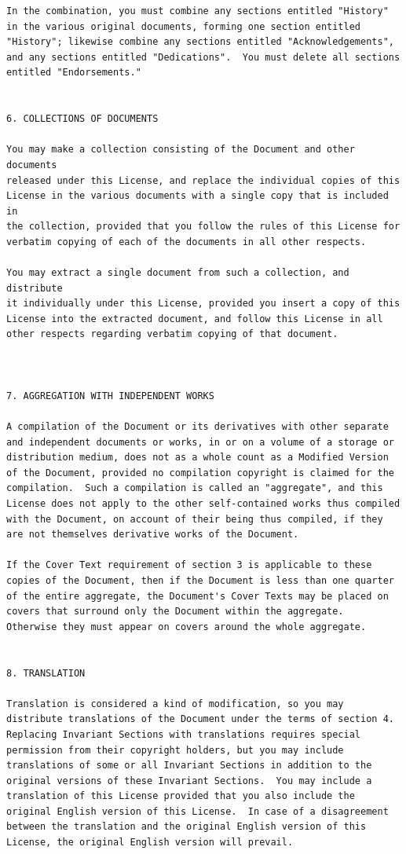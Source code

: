 \documentclass[12pt]{report}
\begin{document}
\begin{verbatim}
In the combination, you must combine any sections entitled "History"
in the various original documents, forming one section entitled
"History"; likewise combine any sections entitled "Acknowledgements",
and any sections entitled "Dedications".  You must delete all sections
entitled "Endorsements."


6. COLLECTIONS OF DOCUMENTS

You may make a collection consisting of the Document and other documents
released under this License, and replace the individual copies of this
License in the various documents with a single copy that is included in
the collection, provided that you follow the rules of this License for
verbatim copying of each of the documents in all other respects.

You may extract a single document from such a collection, and distribute
it individually under this License, provided you insert a copy of this
License into the extracted document, and follow this License in all
other respects regarding verbatim copying of that document.



7. AGGREGATION WITH INDEPENDENT WORKS

A compilation of the Document or its derivatives with other separate
and independent documents or works, in or on a volume of a storage or
distribution medium, does not as a whole count as a Modified Version
of the Document, provided no compilation copyright is claimed for the
compilation.  Such a compilation is called an "aggregate", and this
License does not apply to the other self-contained works thus compiled
with the Document, on account of their being thus compiled, if they
are not themselves derivative works of the Document.

If the Cover Text requirement of section 3 is applicable to these
copies of the Document, then if the Document is less than one quarter
of the entire aggregate, the Document's Cover Texts may be placed on
covers that surround only the Document within the aggregate.
Otherwise they must appear on covers around the whole aggregate.


8. TRANSLATION

Translation is considered a kind of modification, so you may
distribute translations of the Document under the terms of section 4.
Replacing Invariant Sections with translations requires special
permission from their copyright holders, but you may include
translations of some or all Invariant Sections in addition to the
original versions of these Invariant Sections.  You may include a
translation of this License provided that you also include the
original English version of this License.  In case of a disagreement
between the translation and the original English version of this
License, the original English version will prevail.



\end{verbatim}
\end{document}
